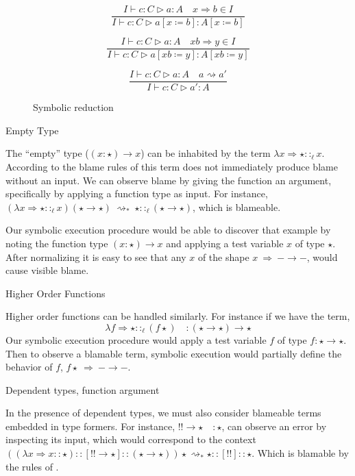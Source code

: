 \begin{figure}
  \[
  \frac{I\vdash  c:C\vartriangleright a:A\quad x\Rightarrow b\in I}{I\vdash  c:C\vartriangleright a\left[x\coloneqq b\right]:A\left[x\coloneqq b\right]}
  \]
  
  \[
  \frac{I\vdash  c:C\vartriangleright a:A\quad xb\Rightarrow y\in I}{I\vdash  c:C\vartriangleright a\left[xb\coloneqq y\right]:A\left[xb\coloneqq y\right]}
  \]
  
  \[
  \frac{I\vdash  c:C\vartriangleright a:A\quad a\rightsquigarrow a'}{I\vdash  c:C\vartriangleright a':A}
  \]
\caption{Symbolic reduction}
\label{fig:sym-env-Sym-red}
\end{figure}
 
 
\begin{example}
  Empty Type

The ``empty'' type ($\left(x:\star\right)\rightarrow x$) can be inhabited by the \clang{} term $\lambda x\Rightarrow\star::_{\ell }x$.
According to the blame rules of  this term does not immediately produce blame without an input.
We can observe blame by giving the function an argument, specifically by applying a function type as input.
For instance, $(\lambda x\Rightarrow\star::_{\ell }x)(\star\rightarrow\star)\ \rightsquigarrow_{*}\ \star::_{\ell }(\star\rightarrow\star)$, which is blameable.

Our symbolic execution procedure would be able to discover that example by noting the function type $\left(x:\star\right)\rightarrow x$ and applying a test variable $x$ of type $\star$.
After normalizing it is easy to see that any $x$ of the shape $x\ \Rightarrow\ -\rightarrow-$, would cause visible blame.
\end{example}


\begin{example}
Higher Order Functions

Higher order functions can be handled similarly.
For instance if we have the \clang{} term,
\[
\lambda f\Rightarrow\star::_{\ell }(f\star) \quad : \left(\star\rightarrow\star\right)\rightarrow\star
\]
  Our symbolic execution procedure would apply a test variable $f$ of type $f:\star\rightarrow\star$.
Then to observe a blamable term, symbolic execution would partially define the behavior of $f$, $f\star\ \Rightarrow\ -\rightarrow-$.
\end{example}

  
 \begin{example}
 Dependent types, function argument
  
 In the presence of dependent types, we must also consider blameable terms embedded in type formers.
 For instance, $!!\rightarrow\star\quad:\star$, can observe an error by inspecting its input, which would correspond to the context $\left(\left(\lambda x\Rightarrow x::\star\right)::[!!\rightarrow\star]::\left(\star\rightarrow\star\right)\right)\star\rightsquigarrow_{*}\star::[!!]::\star$.
 Which is blamable by the rules of .
\end{example}

